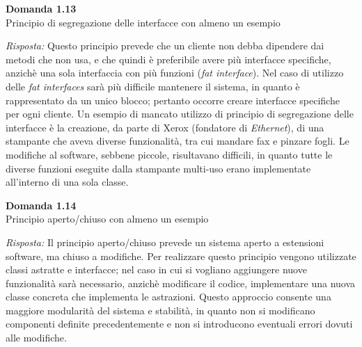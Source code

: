 \documentclass{article}
\newenvironment{problem}[2][Domanda]
    { \begin{mdframed}[backgroundcolor=gray!20] \textbf{#1 #2} \\}
    {  \end{mdframed}}
\newenvironment{solution}
    {\textit{Risposta:}}
    {}
\begin{document}
\begin{problem}{1.13}
Principio di segregazione delle interfacce con almeno un esempio
\end{problem}
\begin{solution}
Questo principio prevede che un cliente non debba dipendere dai metodi che non usa, e che quindi è preferibile avere più interfacce specifiche, anzichè una sola interfaccia con più funzioni (\textit{fat interface}).
\newline
Nel caso di utilizzo delle \textit{fat interfaces} sarà più difficile mantenere il sistema, in quanto è rappresentato da un unico blocco; pertanto occorre creare interfacce specifiche per ogni cliente.
\newline
Un esempio di mancato utilizzo di principio di segregazione delle interfacce è la creazione, da parte di Xerox (fondatore di \textit{Ethernet}), di una stampante che aveva diverse funzionalità, tra cui mandare fax e pinzare fogli. Le modifiche al software, sebbene piccole, risultavano difficili, in quanto tutte le diverse funzioni eseguite dalla stampante multi-uso erano implementate all'interno di una sola classe.
\end{solution}


\begin{problem}{1.14}
Principio aperto/chiuso con almeno un esempio
\end{problem}
\begin{solution}
Il principio aperto/chiuso prevede un sistema aperto a estensioni software, ma chiuso a modifiche.
\newline
Per realizzare questo principio vengono utilizzate classi astratte e interfacce; nel caso in cui si vogliano aggiungere nuove funzionalità sarà necessario, anzichè modificare il codice, implementare una nuova classe concreta che implementa le astrazioni.
\newline
Questo approccio consente una maggiore modularità del sistema e stabilità, in quanto non si modificano componenti definite precedentemente e non si introducono eventuali errori dovuti alle modifiche.
\end{solution}
\end{document}
